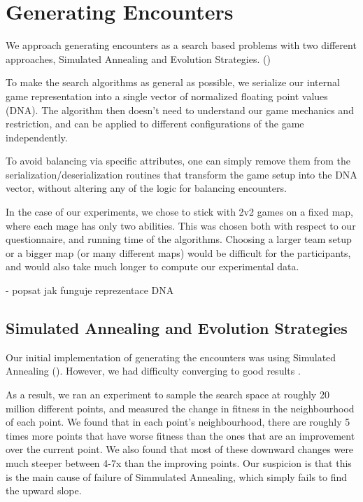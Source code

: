 \chapter{Generating Encounters}

We approach generating encounters as a search based problems with two
different approaches, Simulated Annealing and Evolution Strategies. ()

To make the search algorithms as general as possible, we serialize our
internal game representation into a single vector of normalized floating
point values (DNA). The algorithm then doesn't need to understand our game
mechanics and restriction, and can be applied to different configurations of
the game independently.

To avoid balancing via specific attributes, one can simply remove them from
the serialization/deserialization routines that transform the game setup into
the DNA vector, without altering any of the logic for balancing encounters.

In the case of our experiments, we chose to stick with 2v2 games on a fixed map,
where each mage has only two abilities. This was chosen both with respect to our
questionnaire, and running time of the algorithms. Choosing a larger team setup or
a bigger map (or many different maps) would be difficult for the participants,
and would also take much longer to compute our experimental data.


- popsat jak funguje reprezentace DNA

\section{Simulated Annealing and Evolution Strategies}

Our initial implementation of generating the encounters was using Simulated
Annealing (). However, we had difficulty converging to good
results .

As a result, we ran an experiment to sample the search space at roughly 20
million different points, and measured the change in fitness in the
neighbourhood of each point. We found that in each point's neighbourhood,
there are roughly 5 times more points that have worse fitness than the ones
that are an improvement over the current point. We also found that most of
these downward changes were much steeper between 4-7x than the improving
points. Our suspicion is that this is the main cause of failure of
Simmulated Annealing, which simply fails to find the upward slope.

